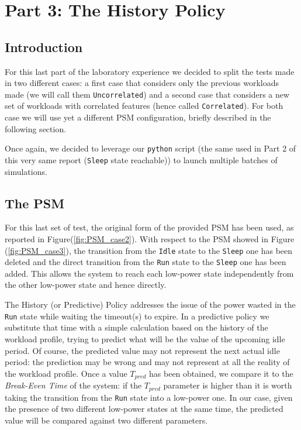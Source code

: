 \documentclass[a4paper]{article}
\begin{document}
%
\section{Part 3: The History Policy}
    \subsection{Introduction}
        For this last part of the laboratory experience we decided to split the tests made in two different cases: a first case that considers only the previous workloads made (we will call them \texttt{Uncorrelated}) and a second case that considers a new set of workloads with correlated features (hence called \texttt{Correlated}).
        For both case we will use yet a different PSM configuration, briefly described in the following section.

        Once again, we decided to leverage our \texttt{python} script (the same used in Part 2 of this very same report (\texttt{Sleep} state reachable)) to launch multiple batches of simulations.

    \subsection{The PSM}
        For this last set of test, the original form of the provided PSM has been used, as reported in Figure(\ref{fig:PSM_case2}). With respect to the PSM showed in Figure (\ref{fig:PSM_case3}), the transition from the \texttt{Idle} state to the \texttt{Sleep} one has been deleted and the direct transition from the \texttt{Run} state to the \texttt{Sleep} one has been added. This allows the system to reach each low-power state independently from the other low-power state and hence directly.

        The History (or Predictive) Policy addresses the issue of the power wasted in the \texttt{Run} state while waiting the timeout(s) to expire. In a predictive policy we substitute that time with a simple calculation based on the history of the workload profile, trying to predict what will be the value of the upcoming idle period. Of course, the predicted value may not represent the next actual idle period: the prediction may be wrong and may not represent at all the reality of the workload profile.
        Once a value $T_{pred}$ has been obtained, we compare it to the \emph{Break-Even Time} of the system: if the $T_{pred}$ parameter is higher than it is worth taking the transition from the \texttt{Run} state into a low-power one. In our case, given the presence of two different low-power states at the same time, the predicted value will be compared against two different parameters.
\end{document}
